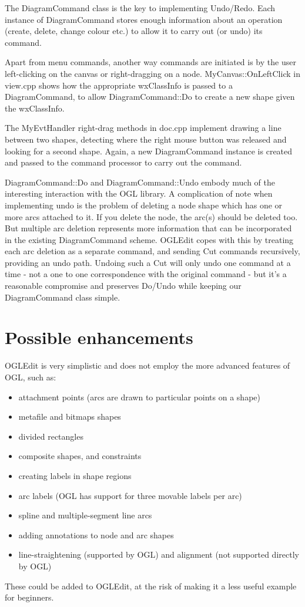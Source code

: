 The DiagramCommand class is the key to implementing Undo/Redo. Each instance of DiagramCommand
stores enough information about an operation (create, delete, change colour etc.) to allow
it to carry out (or undo) its command.

Apart from menu commands, another way commands are initiated is by the user left-clicking on
the canvas or right-dragging on a node. MyCanvas::OnLeftClick in view.cpp shows how
the appropriate wxClassInfo is passed to a DiagramCommand, to allow DiagramCommand::Do
to create a new shape given the wxClassInfo.

The MyEvtHandler right-drag methods in doc.cpp implement drawing a line between
two shapes, detecting where the right mouse button was released and looking for a second
shape. Again, a new DiagramCommand instance is created and passed to the command
processor to carry out the command.

DiagramCommand::Do and DiagramCommand::Undo embody much of the
interesting interaction with the OGL library. A complication of note
when implementing undo is the problem of deleting a node shape which has
one or more arcs attached to it. If you delete the node, the arc(s)
should be deleted too. But multiple arc deletion represents more information
that can be incorporated in the existing DiagramCommand scheme. OGLEdit
copes with this by treating each arc deletion as a separate command, and
sending Cut commands recursively, providing an undo path. Undoing such a
Cut will only undo one command at a time - not a one to one
correspondence with the original command - but it's a reasonable
compromise and preserves Do/Undo while keeping our DiagramCommand class
simple.

\section{Possible enhancements}

OGLEdit is very simplistic and does not employ the more advanced features
of OGL, such as:

\begin{itemize}\itemsep=0pt
\item attachment points (arcs are drawn to particular points on a shape)
\item metafile and bitmaps shapes
\item divided rectangles
\item composite shapes, and constraints
\item creating labels in shape regions
\item arc labels (OGL has support for three movable labels per arc)
\item spline and multiple-segment line arcs
\item adding annotations to node and arc shapes
\item line-straightening (supported by OGL) and alignment (not supported directly by OGL)
\end{itemize}

These could be added to OGLEdit, at the risk of making it a less
useful example for beginners.
